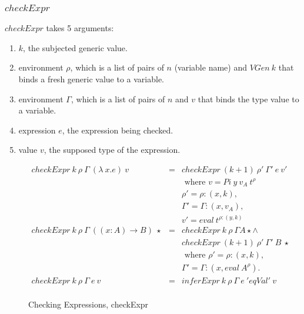 \documentclass[acmsmall]{acmart}
\begin{document}
\subsubsection{$checkExpr$}
\label{sec:checkExpr}

$checkExpr$ takes 5 arguments:

\begin{enumerate}
  \item $k$, the subjected generic value.
  \item environment $\rho$, which is a list of pairs of $n$ (variable name) and $VGen \: k$ that binds a fresh generic value to a variable.
  \item environment $\Gamma$, which is a list of pairs of $n$ and $v$ that binds the type value to a variable.
  \item expression $e$, the expression being checked.
  \item value $v$, the supposed type of the expression.
\end{enumerate}

\begin{figure}[H]
  \begin{equation*}
    \begin{aligned}
      checkExpr \: k \: \rho \: \Gamma \: (\lambda \: x.e) \: v  & = & checkExpr \: (k + 1) \: \rho' \: \Gamma' \:e \: v'          \\
                                                                 &   & \textrm{ where } v = Pi \: y \: v_A \: t^{\rho}             \\ 
                                                                 &   & \rho' = \rho : (x, k),                                      \\
                                                                 &   & \Gamma' = \Gamma : (x, v_A),                                \\
                                                                 &   & v' = eval \: t^{\rho:(y, k)}                                \\
      checkExpr \: k \: \rho \: \Gamma \: ((x:A) \to B) \: \star & = & checkExpr \: k \: \rho \: \Gamma A \star              \land \\
                                                                 &   & checkExpr \: (k+1) \: \rho' \: \Gamma' \: B \: \star        \\
                                                                 &   & \textrm{ where } \rho' = \rho : (x, k),                     \\
                                                                 &   & \Gamma' = \Gamma:(x, eval \: A^{\rho}).                     \\
      checkExpr \: k \: \rho \: \Gamma \: e \: v                 & = & inferExpr \: k \: \rho \: \Gamma \: e \: 'eqVal' \: v       \\
    \end{aligned}
  \end{equation*}
  \caption{Checking Expressions, checkExpr}
\end{figure}
\end{document}
